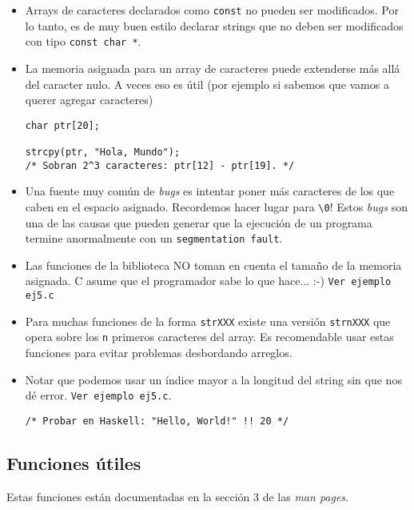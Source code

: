 \documentclass[12pt,a4paper,spanish]{article}
\begin{document}
\begin{itemize}

\item Arrays de caracteres declarados como \verb+const+ no pueden ser
modificados. Por lo tanto, es de muy buen estilo declarar strings que no
deben ser modificados con tipo \verb+const char *+.

\item La memoria asignada para un array de caracteres puede extenderse
más allá del caracter nulo. A veces eso es útil (por ejemplo si sabemos que vamos
a querer agregar caracteres)

\begin{verbatim}
char ptr[20];

strcpy(ptr, "Hola, Mundo");
/* Sobran 2^3 caracteres: ptr[12] - ptr[19]. */
\end{verbatim}

\item Una fuente muy común de \textit{bugs} es intentar poner más
caracteres de los que caben en el espacio asignado. Recordemos hacer
lugar para \verb+\0+! Estos \textit{bugs} son una de las causas que
pueden generar que la ejecución de un programa termine anormalmente con un
\verb+segmentation fault+.

\item Las funciones de la biblioteca NO toman en cuenta el tamaño de la
memoria asignada. \textsf{C} asume que el programador sabe lo que
hace... :-) \verb+Ver ejemplo ej5.c+

\item Para muchas funciones de la forma \verb+strXXX+ existe una versión
\verb+strnXXX+ que opera sobre los \verb+n+ primeros caracteres del array.
Es recomendable usar estas funciones para evitar problemas desbordando arreglos.

\item Notar que podemos usar un índice mayor a la longitud del string
sin que nos dé error. \verb+Ver ejemplo ej5.c+.

\begin{verbatim}
/* Probar en Haskell: "Hello, World!" !! 20 */
\end{verbatim}

\end{itemize}

\subsection*{Funciones útiles}

Estas funciones están documentadas en la sección 3 de las \textit{man
pages}.
\end{document}
